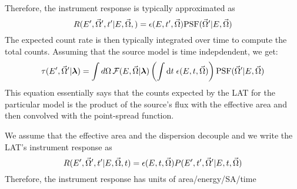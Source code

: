 Therefore, the instrument response is typically approximated as
\begin{equation}
  R(E',\vec\Omega',t'|E,\vec\Omega,) = 
  \epsilon(E,t',\vec\Omega) \text{PSF}(\vec\Omega'|E,\vec\Omega)
\end{equation}
The expected count rate is then typically integrated over time
to compute the total counts. Assuming that the source model
is time indepdendent, we get: 
\begin{equation}
  \tau(E',\vec\Omega'|\boldsymbol{\lambda})
  = \int d\Omega \,
  \mathcal{F}(E,\vec\Omega|\boldsymbol{\lambda}) 
\left(
\int \text{d}t \; \epsilon(E,t,\vec\Omega) 
\right)
\text{PSF}(\vec\Omega'|E,\vec\Omega)
\end{equation}
This equation essentially says that the counts expected by the LAT
for the particular model
is the product of the source's flux with the effective area and then
convolved with the point-spread function.








We assume that the effective area and the dispersion decouple and
we write the LAT's instrument response as
\begin{equation}
  R(E',\vec\Omega',t'|E,\vec\Omega,t) = 
\epsilon(E,t,\vec\Omega) P(E',t',\vec\Omega'|E,t,\vec\Omega)
\end{equation}
Therefore, the instrument response has units of area/energy/\acl{SA}/time
